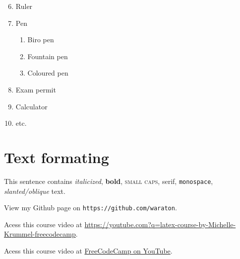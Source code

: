 \documentclass[14pt]{article}
\begin{document}
	\begin{enumerate}[A:-]\setcounter{enumii}{5}
		\item Ruler
		\item Pen
			\begin{enumerate}
				\item Biro pen
				\item Fountain pen
				\item Coloured pen
			\end{enumerate}
		\item Exam permit
		\item Calculator
		\item etc.
	\end{enumerate}
	
	\section{Text formating}
	
	This sentence contains \textit{italicized}, \textbf{bold}, \textsc{small caps}, \textsf{serif}, \texttt{monospace}, \textsl{slanted/oblique} text.
	
	View my Github page on \texttt{https://github.com/waraton}.
	
	Acess this course video at \url{https://youtube.com?q=latex-course-by-Michelle-Krummel-freecodecamp}.	
	
	Acess this course video at \href{https://youtube.com?q=latex-course-by-Michelle-Krummel-freecodecamp}{FreeCodeCamp on YouTube}.
	
\end{document}
